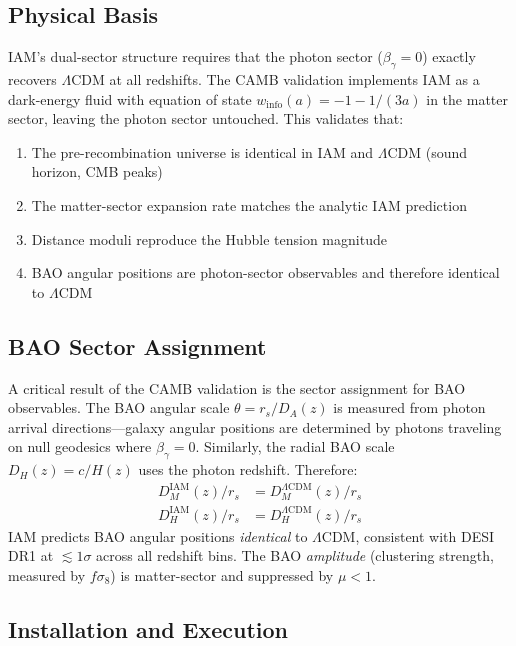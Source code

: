 \documentclass[11pt]{article}
\begin{document}
\subsection{Physical Basis}

IAM's dual-sector structure requires that the photon sector ($\beta_\gamma = 0$) exactly recovers $\Lambda$CDM at all redshifts. The CAMB validation implements IAM as a dark-energy fluid with equation of state $w_\text{info}(a) = -1 - 1/(3a)$ in the matter sector, leaving the photon sector untouched. This validates that:
\begin{enumerate}
    \item The pre-recombination universe is identical in IAM and $\Lambda$CDM (sound horizon, CMB peaks)
    \item The matter-sector expansion rate matches the analytic IAM prediction
    \item Distance moduli reproduce the Hubble tension magnitude
    \item BAO angular positions are photon-sector observables and therefore identical to $\Lambda$CDM
\end{enumerate}

\subsection{BAO Sector Assignment}

A critical result of the CAMB validation is the sector assignment for BAO observables. The BAO angular scale $\theta = r_s / D_A(z)$ is measured from photon arrival directions---galaxy angular positions are determined by photons traveling on null geodesics where $\beta_\gamma = 0$. Similarly, the radial BAO scale $D_H(z) = c/H(z)$ uses the photon redshift. Therefore:
\begin{align}
D_M^{\text{IAM}}(z) / r_s &= D_M^{\Lambda\text{CDM}}(z) / r_s \nonumber \\
D_H^{\text{IAM}}(z) / r_s &= D_H^{\Lambda\text{CDM}}(z) / r_s
\end{align}
IAM predicts BAO angular positions \textit{identical} to $\Lambda$CDM, consistent with DESI DR1 at $\lesssim 1\sigma$ across all redshift bins. The BAO \textit{amplitude} (clustering strength, measured by $f\sigma_8$) is matter-sector and suppressed by $\mu < 1$.

\subsection{Installation and Execution}
\end{document}
